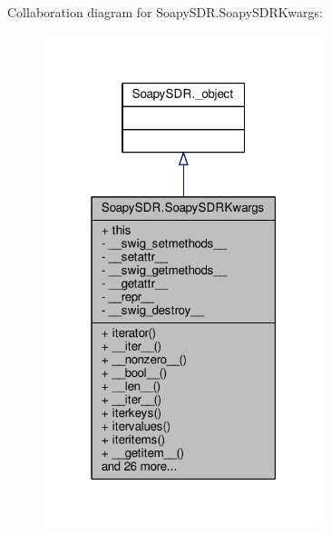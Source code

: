 Collaboration diagram for Soapy\+S\+D\+R.\+Soapy\+S\+D\+R\+Kwargs\+:
\nopagebreak
\begin{figure}[H]
\begin{center}
\leavevmode
\includegraphics[width=232pt]{d0/da9/classSoapySDR_1_1SoapySDRKwargs__coll__graph}
\end{center}
\end{figure}
